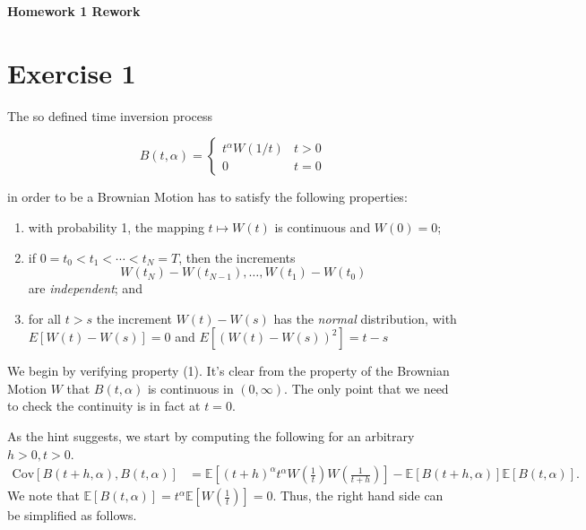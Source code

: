 \documentclass[a4paper,12pt]{article} %
\newcommand{\Cov}{\mathrm{Cov}}
\begin{document}
\begin{center} %
    {\Large \bf Homework 1 Rework}
\end{center}

\vspace{0.4cm}


\onehalfspacing
\section{Exercise 1}
The so defined time inversion process

\begin{equation}
    B(t, \alpha) = \begin{cases}
        t^{\alpha} W(1/t) & t > 0 \\
        0                 & t = 0
    \end{cases}
\end{equation}

in order to be a Brownian Motion has to satisfy the following properties:
\begin{enumerate}
    \item with probability 1, the mapping \( t \mapsto W(t) \) is continuous and \( W(0) = 0 \);
    \item if \( 0 = t_0 < t_1 < \cdots < t_N = T \), then the increments
          \[
              W(t_N) - W(t_{N-1}), \dots, W(t_1) - W(t_0)
          \]
          are \textit{independent}; and
    \item for all \( t > s \) the increment \( W(t) - W(s) \) has the \textit{normal} distribution, with \( E[W(t) - W(s)] = 0 \) and \( E[(W(t) - W(s))^2] = t - s \)
\end{enumerate}

We begin by verifying property (1). It's clear from the property of the Brownian Motion \(W\) that \(B(t, \alpha )\) is continuous in \((0, \infty )\). The only point that we need to check the continuity is in fact at \(t=0\).

As the hint suggests, we start by computing the following for an arbitrary \(h>0, t>0\).
\begin{align*}
    \Cov\left[B(t+h, \alpha), B(t, \alpha)\right]
     & = \mathbb{E} \left[ (t+h)^{\alpha} t^{\alpha} W\left( \frac{1}{t} \right) W\left( \frac{1}{t+h} \right) \right] - \mathbb{E} \left[ B(t+h, \alpha) \right] \mathbb{E} \left[ B(t, \alpha) \right].
\end{align*}
We note that \( \mathbb{E} \left[ B(t, \alpha) \right] = t^{\alpha }\mathbb{E} \left[ W\left( \frac{1}{t} \right)  \right]=0 \). Thus, the right hand side can be simplified as follows.
\end{document}
